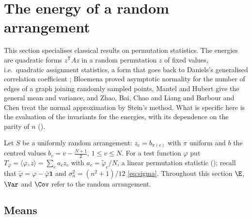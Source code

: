 \section{The energy of a random arrangement}
\label{sec:random_energy}

This section specialises classical results on permutation statistics.
The energies are quadratic forms $z^{\mathsf T}Az$ in a random permutation $z$ of fixed values, i.e.\ quadratic assignment statistics, a form that goes back to Daniels's generalised correlation coefficient \cite{daniels1944}; Bloemena \cite{bloemena1964} proved asymptotic normality for the number of edges of a graph joining randomly sampled points, Mantel \cite{mantel1967} and Hubert \cite{hubert1987assignment} give the general mean and variance, and Zhao, Bai, Chao and Liang \cite{zhao1997} and Barbour and Chen \cite{barbour2005} treat the normal approximation by Stein's method.
What is specific here is the evaluation of the invariants for the energies, with its dependence on the parity of $n$ ().

Let $S$ be a uniformly random arrangement: $z_c=b_{\pi(c)}$ with $\pi$ uniform and $b$ the centred values $b_v=v-\frac{N+1}2$, $1\le v\le N$.
For a test function $\varphi$ put $T_\varphi=\langle\varphi,z\rangle=\sum_ca_cz_c$ with $a_c=\tilde\varphi_c/N$, a linear permutation statistic (); recall that $\tilde\varphi=\varphi-\bar\varphi\mathbf 1$ and $\sigma_n^2=(n^2+1)/12$ \eqref{eq:sigma}.
Throughout this section $\E$, $\Var$ and $\Cov$ refer to the random arrangement.

\subsection{Means}


